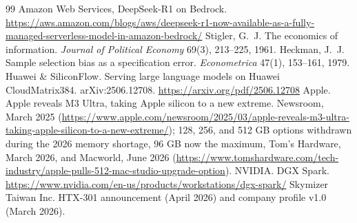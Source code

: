 \documentclass[11pt]{article}
\begin{document}
\begin{thebibliography}{99}
Amazon Web Services, DeepSeek-R1 on Bedrock.
\url{https://aws.amazon.com/blogs/aws/deepseek-r1-now-available-as-a-fully-managed-serverless-model-in-amazon-bedrock/}
 Stigler, G.~J. The economics of information. \emph{Journal of
Political Economy} 69(3), 213--225, 1961.
 Heckman, J.~J. Sample selection bias as a specification error.
\emph{Econometrica} 47(1), 153--161, 1979.
 Huawei \& SiliconFlow. Serving large language models on Huawei
CloudMatrix384. arXiv:2506.12708. \url{https://arxiv.org/pdf/2506.12708}
 Apple. Apple reveals M3 Ultra, taking Apple silicon to a new
extreme. Newsroom, March 2025
(\url{https://www.apple.com/newsroom/2025/03/apple-reveals-m3-ultra-taking-apple-silicon-to-a-new-extreme/});
128, 256, and 512 GB options withdrawn during the 2026 memory shortage,
96 GB now the maximum, Tom's Hardware, March 2026, and Macworld, June 2026
(\url{https://www.tomshardware.com/tech-industry/apple-pulls-512-mac-studio-upgrade-option}).
 NVIDIA. DGX Spark.
\url{https://www.nvidia.com/en-us/products/workstations/dgx-spark/}
 Skymizer Taiwan Inc. HTX-301 announcement (April 2026) and
company profile v1.0 (March 2026).
\end{thebibliography}
\end{document}
